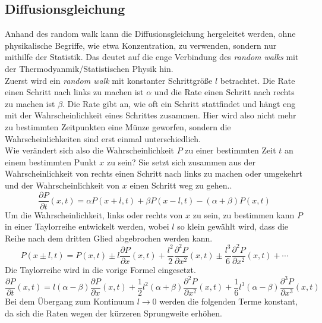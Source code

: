 \subsection*{Diffusionsgleichung}
Anhand des random walk kann die Diffusionsgleichung hergeleitet werden, ohne physikalische Begriffe, wie etwa Konzentration, zu verwenden, sondern nur mithilfe der Statistik. Das deutet auf die enge Verbindung des \emph{random walks} mit der Thermodyanmik/Statistischen Physik hin.\\
Zuerst wird ein \emph{random walk} mit konstanter Schrittgröße $l$ betrachtet. Die Rate einen Schritt nach links zu machen ist $\alpha$ und die Rate einen Schritt nach rechts zu machen ist $\beta$. Die Rate gibt an, wie oft ein Schritt stattfindet und hängt eng mit der Wahrscheinlichkeit eines Schrittes zusammen. Hier wird also nicht mehr zu bestimmten Zeitpunkten eine Münze geworfen, sondern die Wahrscheinlichkeiten sind erst einmal unterschiedlich.\\ Wie verändert sich also die Wahrscheinlichkeit $P$ zu einer bestimmten Zeit $t$ an einem bestimmten Punkt $x$ zu sein? Sie setzt sich zusammen aus der Wahrscheinlichkeit von rechts einen Schritt nach links zu machen oder umgekehrt und der Wahrscheinlichkeit von $x$ einen Schritt weg zu gehen..
\begin{equation}
  \frac{\partial P}{\partial t} (x, t) = \alpha P(x + l, t) + \beta P(x - l, t) - (\alpha + \beta) P(x, t)
\end{equation}
Um die Wahrscheinlichkeit, links oder rechts von $x$ zu sein, zu bestimmen kann $P$ in einer Taylorreihe entwickelt werden, wobei $l$ so klein gewählt wird, dass die Reihe nach dem dritten Glied abgebrochen werden kann.
\begin{equation}
  P(x \pm l, t) = P(x, t) \pm l \frac{\partial P}{\partial x}(x, t) + \frac{l^2}{2} \frac{\partial^2 P}{\partial x^2}(x, t) \pm \frac{l^3}{6} \frac{\partial^2 P}{\partial x^2}(x, t) + \cdots
\end{equation}
Die Taylorreihe wird in die vorige Formel eingesetzt.
\begin{equation}
  \frac{\partial P}{\partial t} (x, t) = l (\alpha - \beta) \frac{\partial P}{\partial x}(x, t) + \frac{1}{2} l^2 (\alpha + \beta) \frac{\partial^2 P}{\partial x^2}(x, t) + \frac{1}{6} l^3 (\alpha - \beta) \frac{\partial^3 P}{\partial x^3}(x, t)
\end{equation}
Bei dem Übergang zum Kontinuum $l \to 0$ werden die folgenden Terme konstant, da sich die Raten wegen der kürzeren Sprungweite erhöhen.
